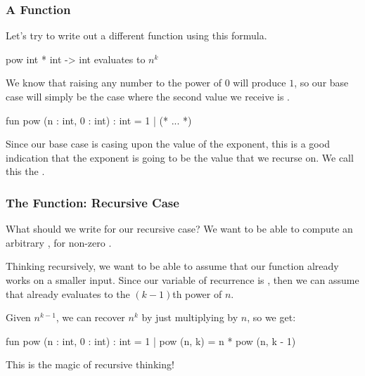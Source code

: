\documentclass[aspectratio=169, handout]{beamer}
\begin{document}
\begin{frame}[fragile]
  \frametitle{A  Function}

  Let's try to write out a different function using this formula.

  \spec
    {pow}
    {int * int -> int}
    {}
    { evaluates to $n^k$}

  \pause
  \vspace{\fill}

  We know that raising any number to the power of $0$ will produce $1$, so
  our base case will simply be the case where the second value we receive is
  .

  \pause
  \begin{codeblock}
    fun pow (n : int, 0 : int) : int = 1
      | (* ... *)
  \end{codeblock}

  \pause
  \vspace{\fill}

  Since our base case is casing upon the value of the exponent, this is a good
  indication that the exponent is going to be the value that we recurse on. We
  call this the .
\end{frame}

\begin{frame}[fragile]
  \frametitle{The  Function: Recursive Case}

  What should we write for our recursive case? We want to be able to compute
  an arbitrary , for non-zero .

  \pause
  \vspace{\fill}

  Thinking recursively, we want to be able to assume that our function already
  works on a smaller input. Since our variable of recurrence is , then
  we can assume that  already evaluates to the
  $(k-1)$th power of $n$.

  \pause
  \vspace{\fill}

  Given $n^{k - 1}$, we can recover $n^k$ by just multiplying by $n$, so we get:

  \begin{codeblock}
    fun pow (n : int, 0 : int) : int = 1
      | pow (n, k) = n * pow (n, k - 1)
  \end{codeblock}

  \pause
  \vspace{\fill}

  This is the magic of recursive thinking!
\end{frame}
\end{document}
